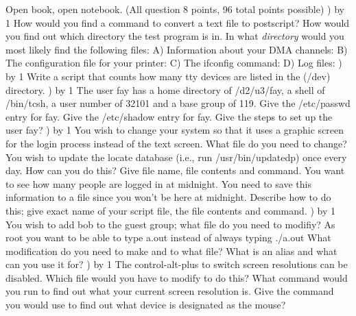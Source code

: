 
\parindent=0in
\nopagenumbers
\newcount\quesno
{}
\def\ques{\number\quesno) \advance\quesno by 1}
\def\aspace{\vskip 1.5in}

Open book, open notebook. (All question 8 points, 96 total points possible)
\hfill\break
\ques
How would you find a command to convert a text file to postscript?
\vskip 0.4in
How would you find out which directory the {\ltt{}test} program is in.
\vskip 0.4in
In what {\it directory} would you most likely find
the following files:
\hfill\break
A) Information about your DMA channels:
\vskip 0.3in
B) The configuration file for your printer:
\vskip 0.3in
C) The {\ltt{}ifconfig} command:
\vskip 0.3in
D) Log files:
\vskip 0.3in
\ques
Write a script that counts how many {\ltt{}tty} devices are listed in 
 the ({\ltt{}/dev}) directory.
\vskip 2.0in
\ques
The user {\ltt{}fay} has  a home directory of {\ltt{}/d2/u3/fay},
a shell of {\ltt{}/bin/tcsh}, a user number of {\ltt{}32101}
and a base group of {\ltt{}119}.
Give the {\ltt{}/etc/passwd} entry for {\ltt{}fay}.
\vskip 0.4in
Give the {\ltt{}/etc/shadow} entry for {\ltt{}fay}.
\vskip 0.4in
Give the steps to set up the user {\ltt{}fay}?
\vskip 1.2in
\vfill\eject
\ques
You wish to change your system so that it uses a graphic screen for the login
process instead of the text screen. 
What file do you need to change?
\vskip 0.4in
You wish to update the locate database (i.e., run {\ltt{}/usr/bin/updatedp}) once
every day.
How can you do this? Give file name, file contents and command.
\vskip 1.4in
You want to see how many people are logged in at midnight.
You need to save this information to a file since you won't be here at midnight.
Describe how to do this; give exact name of your script file, the file contents
and command.
\vskip 1.6in
\ques
You wish to add {\ltt{}bob} to the {\ltt{}guest} group;
what file do you need to modifiy?
\vskip 0.4in
As root you want to be able to type {\ltt{}a.out} instead of
always typing {\ltt{}./a.out}
What modification do you need to make and to what file?
\vskip 0.4in
What is an alias and what can you use it for?
\vskip 0.8in
\ques
The control-alt-plus to switch screen resolutions can be disabled.
Which file would you have to modify to do this?
\vskip 0.4in
What command would you run to find out what your current screen resolution is.
\vskip 0.4in
Give the command you would use to find out what device is designated as the mouse?
